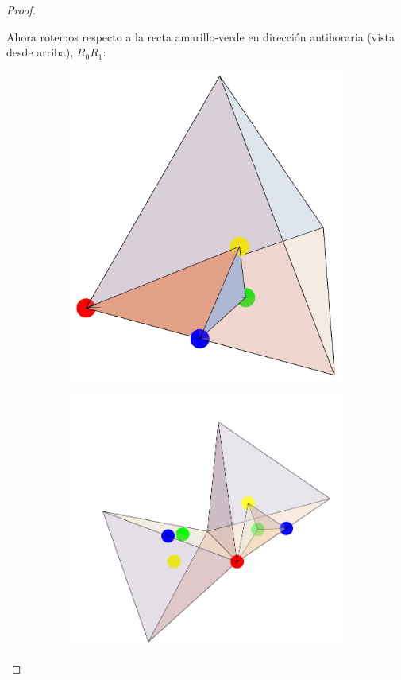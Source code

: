 \documentclass[spanish]{article}
\theoremstyle{definition}
\begin{document}
\begin{proof}
\begin{figure}[H]
\begin{subfigure}{0.5\linewidth}
			\end{subfigure}
		\end{figure}
		Ahora rotemos respecto a la recta amarillo-verde en dirección antihoraria (vista desde arriba), $R_0R_1$:
		\begin{figure}[H]
			\begin{subfigure}{0.4\linewidth}
				\centering
				\includegraphics[width=0.6\linewidth]{p5}
			\end{subfigure}
			\begin{subfigure}{0.4\linewidth}
				\centering
				\includegraphics[width=0.9\linewidth]{p7}

\end{subfigure}
\end{figure}
\end{proof}
\end{document}
